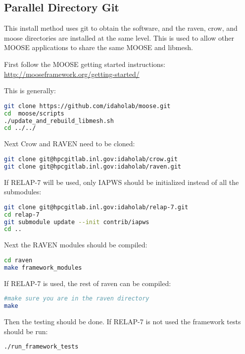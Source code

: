 \subsection{Parallel Directory Git}
\label{parallel_directory_git}

This install method uses git to obtain the software, and the raven,
crow, and moose directories are installed at the same level.  This is
used to allow other MOOSE applications to share the same MOOSE and
libmesh.

First follow the MOOSE getting started instructions:  \url{http://mooseframework.org/getting-started/}

This is generally:

\begin{lstlisting}[language=bash]
git clone https://github.com/idaholab/moose.git
cd  moose/scripts
./update_and_rebuild_libmesh.sh
cd ../../
\end{lstlisting}

Next Crow and RAVEN need to be cloned:

\begin{lstlisting}[language=bash]
git clone git@hpcgitlab.inl.gov:idaholab/crow.git
git clone git@hpcgitlab.inl.gov:idaholab/raven.git
\end{lstlisting}

If RELAP-7 will be used, only IAPWS should be initialized instead of
all the submodules:

\begin{lstlisting}[language=bash]
git clone git@hpcgitlab.inl.gov:idaholab/relap-7.git
cd relap-7
git submodule update --init contrib/iapws
cd ..
\end{lstlisting}

Next the RAVEN modules should be compiled:

\begin{lstlisting}[language=bash]
cd raven
make framework_modules
\end{lstlisting}

If RELAP-7 is used, the rest of raven can be compiled:

\begin{lstlisting}[language=bash]
#make sure you are in the raven directory
make
\end{lstlisting}


Then the testing should be done.  If RELAP-7 is not used the framework
tests should be run:

\begin{lstlisting}[language=bash]
./run_framework_tests
\end{lstlisting}

